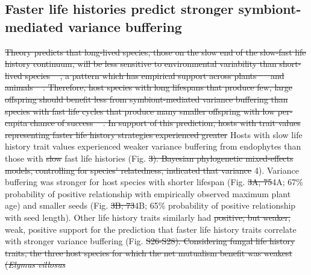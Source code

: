 \documentclass[lineno,sn-nature]{sn-jnl}%
\providecommand{\DIFadd}[1]{{\protect\color{blue}#1}} %
\providecommand{\DIFdel}[1]{{\protect\color{red}\protect\scriptsize\sout{#1}}}
\providecommand{\DIFadd}[1]{{\protect\color{blue}\uwave{#1}}} %
\providecommand{\DIFdel}[1]{{\protect\color{red}\sout{#1}}}                      %
\providecommand{\DIFaddbegin}{} %
\providecommand{\DIFaddend}{} %
\providecommand{\DIFdelbegin}{} %
\providecommand{\DIFdelend}{} %
\newcommand{\DIFscaledelfig}{0.5}
\newlength{\DIFdelgraphicswidth} %
\newlength{\DIFdelgraphicsheight} %
\newcommand{\DIFaddincludegraphics}[2][]{{\color{blue}\fbox{\DIFOincludegraphics[#1]{#2}}}} %
\newcommand{\DIFdelincludegraphics}[2][]{%
\sbox{\DIFdelgraphicsbox}{\DIFOincludegraphics[#1]{#2}}%
\settoboxwidth{\DIFdelgraphicswidth}{\DIFdelgraphicsbox} %
\settoboxtotalheight{\DIFdelgraphicsheight}{\DIFdelgraphicsbox} %
\scalebox{\DIFscaledelfig}{%
\parbox[b]{\DIFdelgraphicswidth}{\usebox{\DIFdelgraphicsbox}\\[-\baselineskip] \rule{\DIFdelgraphicswidth}{0em}}\llap{\resizebox{\DIFdelgraphicswidth}{\DIFdelgraphicsheight}{%
\setlength{\unitlength}{\DIFdelgraphicswidth}%
\begin{picture}(1,1)%
\thicklines\linethickness{2pt} %
{\color[rgb]{1,0,0}\put(0,0){\framebox(1,1){}}}%
{\color[rgb]{1,0,0}\put(0,0){\line( 1,1){1}}}%
{\color[rgb]{1,0,0}\put(0,1){\line(1,-1){1}}}%
\end{picture}%
}\hspace*{3pt}}} %
} %
\DeclareRobustCommand{\DIFaddbegin}{\DIFOaddbegin \let\includegraphics\DIFaddincludegraphics} %
\DeclareRobustCommand{\DIFaddend}{\DIFOaddend \let\includegraphics\DIFOincludegraphics} %
\DeclareRobustCommand{\DIFdelbegin}{\DIFOdelbegin \let\includegraphics\DIFdelincludegraphics} %
\DeclareRobustCommand{\DIFdelend}{\DIFOaddend \let\includegraphics\DIFOincludegraphics} %
\begin{document}
\DIFdelend \subsection*{Faster life histories predict stronger symbiont-mediated variance buffering}
\DIFdelbegin \DIFdel{Theory predicts that long-lived species, those on the slow end of the slow-fast life history continuum, will be less sensitive to environmental variability than short-lived species \mbox{%
\cite{murphy1968pattern}}\hspace{0pt}%
, a pattern which has empirical support across plants \mbox{%
\cite{compagnoni2021herbaceous} }\hspace{0pt}%
and animals \mbox{%
\cite{le2022life,morris2008longevity}}\hspace{0pt}%
.
Therefore, host species with long lifespans that produce few, large offspring should benefit less from symbiont-mediated variance buffering than species with fast life cycles that produce many smaller offspring with low per-capita chance of success \mbox{%
\cite{rees1996evolutionary,moles2004seedling}}\hspace{0pt}%
.
In support of this prediction, hosts with trait values representing faster life history strategies experienced greater }\DIFdelend \DIFaddbegin \DIFadd{Hosts with slow life history trait values experienced weaker }\DIFaddend variance buffering from endophytes than those with \DIFdelbegin \DIFdel{slow }\DIFdelend \DIFaddbegin \DIFadd{fast }\DIFaddend life histories (Fig. \DIFdelbegin \DIFdel{3).
Bayesian phylogenetic mixed-effects models, controlling for species' relatedness, indicated that variance }\DIFdelend \DIFaddbegin \DIFadd{4).
Variance }\DIFaddend buffering was stronger for host species with shorter lifespan (Fig. \DIFdelbegin \DIFdel{3A; 75}\DIFdelend \DIFaddbegin \DIFadd{4A; 67}\DIFaddend \% probability of positive relationship with empirically observed maximum plant age) and smaller seeds (Fig. \DIFdelbegin \DIFdel{3B; 73}\DIFdelend \DIFaddbegin \DIFadd{4B; 65}\DIFaddend \% probability of positive relationship with seed length).
Other life history traits similarly had \DIFdelbegin \DIFdel{positive, but weaker, }\DIFdelend \DIFaddbegin \DIFadd{weak, positive }\DIFaddend support for the prediction that faster life history traits correlate with stronger variance buffering (Fig. \DIFdelbegin \DIFdel{S26-S28). 
Considering fungal life history traits, the three host species for which the net mutualism benefit was weakest (}\emph{\DIFdel{Elymus villosus}}%
\end{document}
